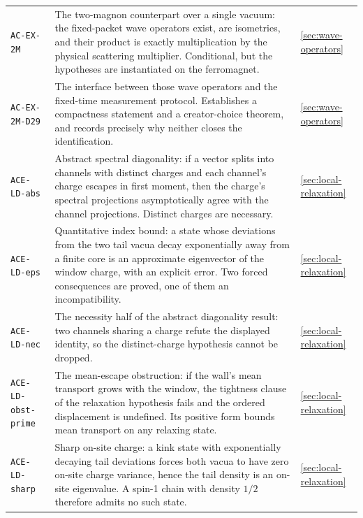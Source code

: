 {\begin{longtable}{@{}p{}p{}p{}@{}}
\texttt{AC-EX-2M} & The two-magnon counterpart over a single vacuum: the
fixed-packet wave operators exist, are isometries, and their product is
exactly multiplication by the physical scattering multiplier. Conditional, but
the hypotheses are instantiated on the ferromagnet. & \cref{sec:wave-operators}\\

\texttt{AC-EX-2M-D29} & The interface between those wave operators and the
fixed-time measurement protocol. Establishes a compactness statement and a
creator-choice theorem, and records precisely why neither closes the
identification. & \cref{sec:wave-operators}\\

\texttt{ACE-LD-abs} & Abstract spectral diagonality: if a vector splits into
channels with distinct charges and each channel's charge escapes in first
moment, then the charge's spectral projections asymptotically agree with the
channel projections. Distinct charges are necessary. & \cref{sec:local-relaxation}\\

\texttt{ACE-LD-eps} & Quantitative index bound: a state whose deviations from
the two tail vacua decay exponentially away from a finite core is an
approximate eigenvector of the window charge, with an explicit error. Two
forced consequences are proved, one of them an incompatibility. & \cref{sec:local-relaxation}\\

\texttt{ACE-LD-nec} & The necessity half of the abstract diagonality result:
two channels sharing a charge refute the displayed identity, so the
distinct-charge hypothesis cannot be dropped. & \cref{sec:local-relaxation}\\

\texttt{ACE-LD-obst-prime} & The mean-escape obstruction: if the wall's mean
transport grows with the window, the tightness clause of the relaxation
hypothesis fails and the ordered displacement is undefined. Its positive form
bounds mean transport on any relaxing state. & \cref{sec:local-relaxation}\\

\texttt{ACE-LD-sharp} & Sharp on-site charge: a kink state with exponentially
decaying tail deviations forces both vacua to have zero on-site charge
variance, hence the tail density is an on-site eigenvalue. A spin-1 chain
with density $1/2$ therefore admits no such state. & \cref{sec:local-relaxation}\\


\end{longtable}}
